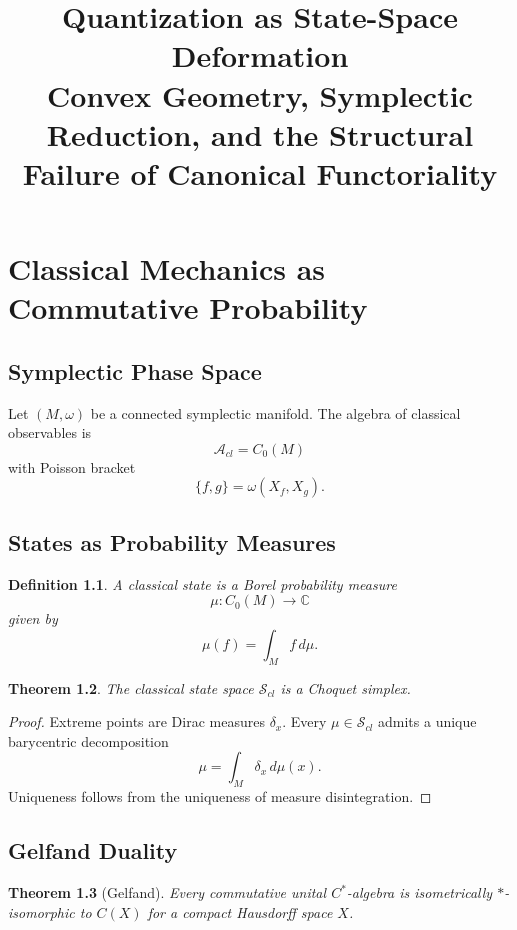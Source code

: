 \documentclass[11pt]{book}
\title{Quantization as State-Space Deformation\\
\large Convex Geometry, Symplectic Reduction, and the Structural Failure of Canonical Functoriality}
\author{}
\date{}
\newtheorem{theorem}{Theorem}[chapter]
\newtheorem{definition}[theorem]{Definition}
\begin{document}
\maketitle
\tableofcontents

\chapter{Classical Mechanics as Commutative Probability}

\section{Symplectic Phase Space}

Let $(M,\omega)$ be a connected symplectic manifold.
The algebra of classical observables is
\[
\mathcal{A}_{cl} = C_0(M)
\]
with Poisson bracket
\[
\{f,g\} = \omega(X_f,X_g).
\]

\section{States as Probability Measures}

\begin{definition}
A classical state is a Borel probability measure
\[
\mu : C_0(M) \to \mathbb{C}
\]
given by
\[
\mu(f) = \int_M f \, d\mu.
\]
\end{definition}

\begin{theorem}
The classical state space $\mathcal{S}_{cl}$
is a Choquet simplex.
\end{theorem}

\begin{proof}
Extreme points are Dirac measures $\delta_x$.
Every $\mu \in \mathcal{S}_{cl}$ admits a unique
barycentric decomposition
\[
\mu = \int_M \delta_x \, d\mu(x).
\]
Uniqueness follows from the uniqueness of measure disintegration.
\end{proof}

\section{Gelfand Duality}

\begin{theorem}[Gelfand]
Every commutative unital $C^*$-algebra
is isometrically $*$-isomorphic to $C(X)$
for a compact Hausdorff space $X$.
\end{theorem}
\end{document}
